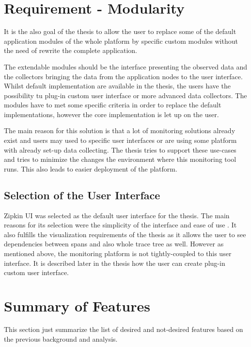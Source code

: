 \section{Requirement - Modularity}
It is the also goal of the thesis to allow the user to replace some of the default application modules of the whole platform by specific custom modules without the need of rewrite the complete application.

The extendable modules should be the interface presenting the observed data and the collectors bringing the data from the application nodes to the user interface. Whilst default implementation are available in the thesis, the users have the possibility tu plug-in custom user interface or more advanced data collectors. The modules have to met some specific criteria in order to replace the default implementations, however the core implementation is let up on the user. 

The main reason for this solution is that a lot of monitoring solutions already exist and users may used to specific user interfaces or are using some platform with already set-up data collecting. The thesis tries to support these use-cases and tries to minimize the changes the environment where this monitoring tool runs. This also leads to easier deployment of the platform. 

\subsection{Selection of the User Interface}
Zipkin UI was selected as the default user interface for the thesis. The main reasons for its selection were the simplicity of the interface and ease of use . It also fulfills the visualization requirements of the thesis as it allows the user to see dependencies between spans and also whole trace tree as well. However as mentioned above, the monitoring platform is not tightly-coupled to this user interface.  It is described later in the thesis how the user can create plug-in custom user interface.

\section{Summary of Features}
This section just summarize the list of desired and not-desired features based on the previous background and analysis.

